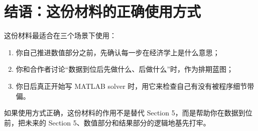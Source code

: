 \documentclass[12pt]{ctexart}
\begin{document}
\section{结语：这份材料的正确使用方式}

这份材料最适合在三个场景下使用：
\begin{enumerate}[leftmargin=2em]
    \item 你自己推进数值部分之前，先确认每一步在经济学上是什么意思；
    \item 你和合作者讨论“数据到位后先做什么、后做什么”时，作为排期蓝图；
    \item 你日后真正开始写 MATLAB solver 时，用它来检查自己有没有被程序细节带偏。
\end{enumerate}

如果使用方式正确，这份材料的作用不是替代 Section 5，而是帮助你在数据到位前，把未来的 Section 5、数值部分和结果部分的逻辑地基先打牢。
\end{document}
